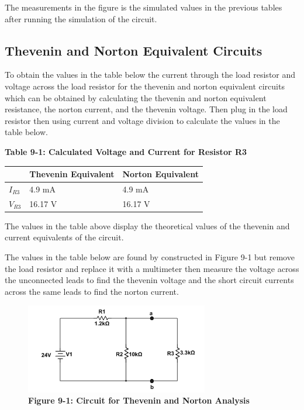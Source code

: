 \documentclass[a4paper]{article}
\begin{document}
The measurements in the figure is the simulated values in the previous tables after running the simulation of the circuit.
\pagebreak

 

\subsection{Thevenin and Norton Equivalent Circuits}

To obtain the values in the table below the current through the load resistor and voltage across the load resistor for the thevenin and norton equivalent circuits
which can be obtained by calculating the thevenin and norton equivalent resistance, the norton current, and the thevenin voltage. Then plug in the load resistor then using 
current and voltage division to calculate the values in the table below.


\begin{center}
    \small\textbf{Table 9-1: Calculated Voltage and Current for Resistor R3}
    \begin{tabular}{|p{3 cm}|p{3cm}|p{3 cm}|}
        \hline
         & Thevenin Equivalent & Norton Equivalent\\
        \hline
        $I_{R3}$ & 4.9 mA & 4.9 mA  \\
        \hline
        $V_{R3}$ & 16.17 V & 16.17 V  \\
        \hline
        
    \end{tabular}
\end{center}

The values in the table above display the theoretical values of the thevenin and current equivalents of the circuit.

The values in the table below are found by constructed in Figure 9-1 but remove the load resistor and replace it with a multimeter then measure the voltage across the unconnected leads to find the thevenin voltage and the short circuit 
currents across the same leads to find the norton current.

\begin{center}
    \begin{figure}[H]\label{fig9-3}
        \begin{center}
            \includegraphics[width = 8cm]{Fig9-3}\\
            \small\textbf{Figure 9-1: Circuit for Thevenin and Norton Analysis}
        \end{center}
    \end{figure}
\end{center}
\end{document}
